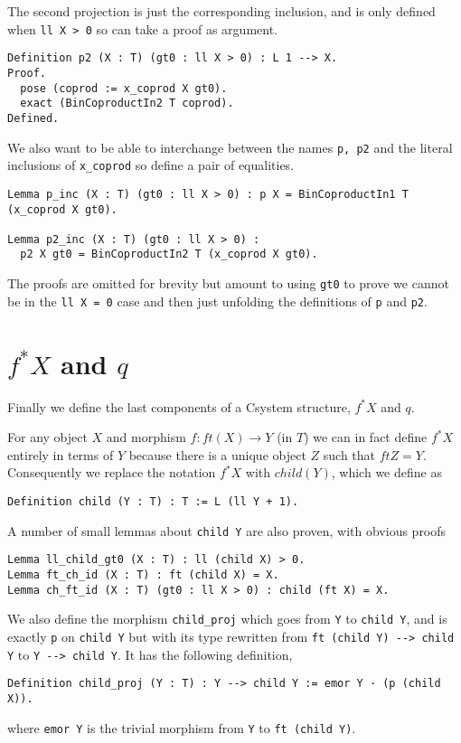 The second projection is just the corresponding inclusion, and is only defined
when \lstinline|ll X > 0| so can take a proof as argument.
\begin{lstlisting}
Definition p2 (X : T) (gt0 : ll X > 0) : L 1 --> X.
Proof.
  pose (coprod := x_coprod X gt0).
  exact (BinCoproductIn2 T coprod).
Defined.
\end{lstlisting}

We also want to be able to interchange between the names \lstinline|p, p2| and the
literal inclusions of \lstinline|x_coprod| so define a pair of equalities.
\begin{lstlisting}
Lemma p_inc (X : T) (gt0 : ll X > 0) : p X = BinCoproductIn1 T (x_coprod X gt0).

Lemma p2_inc (X : T) (gt0 : ll X > 0) : 
  p2 X gt0 = BinCoproductIn2 T (x_coprod X gt0).
\end{lstlisting}
The proofs are omitted for brevity but amount to using \lstinline|gt0| to prove we
cannot be in the \lstinline|ll X = 0| case and then just unfolding the definitions of
\lstinline|p| and \lstinline|p2|.

\section{$f^*X$ and $q$}
Finally we define the last components of a Csystem structure, $f^*X$ and $q$.

For any object $X$ and morphism $f : ft(X)\to Y$ (in $T$) we can in fact define
$f^*X$ entirely in terms of $Y$ because there is a unique object $Z$ such that
$ft Z = Y$. Consequently we replace the notation $f^*X$ with $child(Y)$, which
we define as
\begin{lstlisting}
Definition child (Y : T) : T := L (ll Y + 1).
\end{lstlisting}

A number of small lemmas about \lstinline|child Y| are also proven, with obvious
proofs
\begin{lstlisting}
Lemma ll_child_gt0 (X : T) : ll (child X) > 0.
Lemma ft_ch_id (X : T) : ft (child X) = X.
Lemma ch_ft_id (X : T) (gt0 : ll X > 0) : child (ft X) = X.
\end{lstlisting}

We also define the morphism \lstinline|child_proj| which goes from \lstinline|Y| to
\lstinline|child Y|, and is exactly \lstinline|p| on \lstinline|child Y| but with its type
rewritten from \lstinline|ft (child Y) --> child Y| to \lstinline|Y --> child Y|. It has
the following definition,
\begin{lstlisting}
Definition child_proj (Y : T) : Y --> child Y := emor Y · (p (child X)).
\end{lstlisting}
where \lstinline|emor Y| is the trivial morphism from \lstinline|Y| to 
\lstinline|ft (child Y)|.

